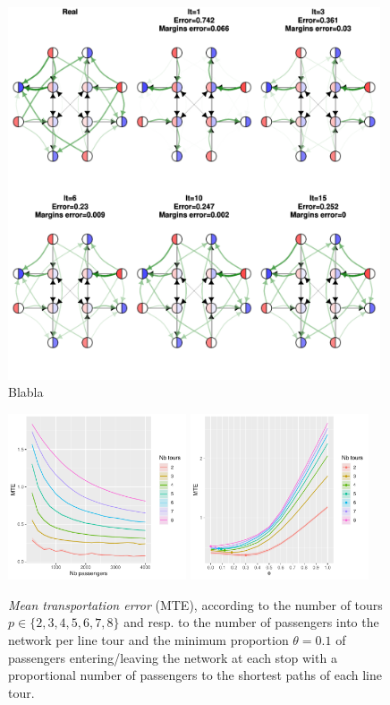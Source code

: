 \documentclass{bmcart}
\begin{document}
\begin{figure}
	\label{iteration_plots}
	\includegraphics[width=0.98\textwidth]{fig/iterations.pdf}
	\caption{Blabla}
\end{figure}

\begin{figure}
	\includegraphics[width=0.47\textwidth]{fig/toy_MTE_passengers_theta01.pdf}
	\includegraphics[width=0.47\textwidth]{fig/toy_MTE_tours.pdf}
	\caption{\emph{Mean transportation error} (MTE), according to the number of tours $p \in \{2,3,4,5,6,7,8\}$ and resp. to the number of passengers into the network per line tour and the minimum proportion $\theta =0.1$ of passengers entering/leaving the network at each stop with a proportional number of passengers to the shortest paths of each line tour.}
	\label{toy_MTE}
\end{figure}
\end{document}
